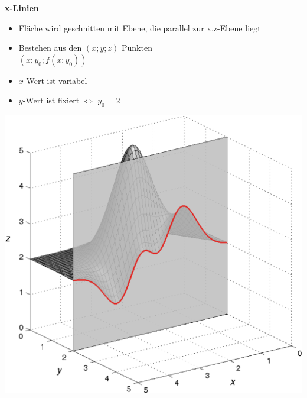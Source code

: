 \begin{minipage}[t]{0.48\columnwidth}
    \textbf{x-Linien}
    \begin{itemize}
        \item Fläche wird geschnitten mit Ebene, die parallel zur x,z-Ebene liegt
        \item Bestehen aus den $(x;y;z)$ Punkten\\
        $(x ; y_0 ; f(x;y_0))$
        \item ${x}$-Wert ist variabel
        \item ${y}$-Wert ist fixiert $\Leftrightarrow$ $y_0 = 2$
    \end{itemize}
    
    \includegraphics[width=\columnwidth]{images/schnitt_y0.png}
\end{minipage}
\hfill
